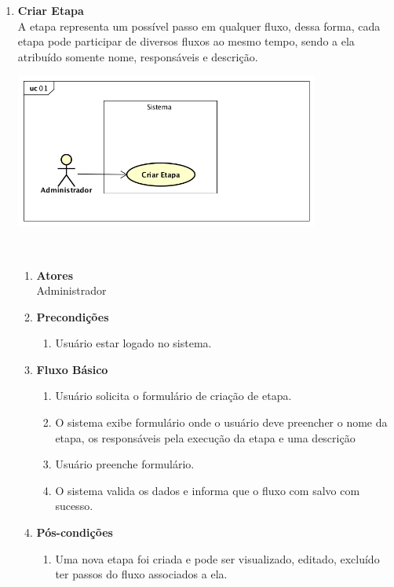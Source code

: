 \begin{enumerate}[label=\textbf{UC\protect\twodigits{\theenumi}}, leftmargin=2cm]
	\item \textbf{Criar Etapa} \\
	A etapa representa um possível passo em qualquer fluxo, dessa forma, cada etapa pode participar de diversos fluxos ao mesmo tempo, sendo a ela atribuído somente nome, responsáveis e descrição. \\
	\begin{minipage}[c]{10cm}
	    \includegraphics[width=10cm]{Imagens/UC_CriarEtapa.png}
		\label{fig:uc_criar_fluxo}
	\end{minipage} \\

	\begin{enumerate}[label=, leftmargin=0cm]
		\item \textbf{Atores} \\
		Administrador
		\item \textbf{Precondições}
			\begin{enumerate}[label=\arabic*.]
				\item Usuário estar logado no sistema.
			\end{enumerate}
		\item \textbf{Fluxo Básico}
			\begin{enumerate}[label=\arabic*.]
				\item Usuário solicita o formulário de criação de etapa.
				\item O sistema exibe formulário onde o usuário deve preencher o nome da etapa, os responsáveis pela execução da etapa e uma descrição
				\item Usuário preenche formulário.
				\item O sistema valida os dados e informa que o fluxo com salvo com sucesso.
			\end{enumerate}
		\item \textbf{Pós-condições}
			\begin{enumerate}[label=\arabic*.]
				\item Uma nova etapa foi criada e pode ser visualizado, editado, excluído ter passos do fluxo associados a ela.
			\end{enumerate}
	\end{enumerate}
	 
\end{enumerate}

